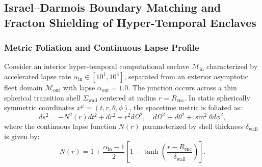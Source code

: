 \documentclass[11pt,onecolumn]{article}
\begin{document}
\subsection{Israel--Darmois Boundary Matching and Fracton Shielding of Hyper-Temporal Enclaves}
\label{sec:israel_darmois_enclaves}

\subsubsection{Metric Foliation and Continuous Lapse Profile}
Consider an interior hyper-temporal computational enclave $\mathcal{M}_{\text{in}}$ characterized by accelerated lapse rate $\alpha_{\text{in}} \in [10^1, 10^4]$, separated from an exterior asymptotic fleet domain $\mathcal{M}_{\text{out}}$ with lapse $\alpha_{\text{out}} = 1.0$. The junction occurs across a thin spherical transition shell $\Sigma_{\text{wall}}$ centered at radius $r = R_{\text{enc}}$. In static spherically symmetric coordinates $x^\mu = (t, r, \theta, \phi)$, the spacetime metric is foliated as:
\begin{equation}
    ds^2 = -N^2(r) dt^2 + dr^2 + r^2 d\Omega^2, \quad d\Omega^2 \equiv d\theta^2 + \sin^2\theta d\phi^2,
    \label{eq:enclave_metric}
\end{equation}
where the continuous lapse function $N(r)$ parameterized by shell thickness $\delta_{\text{wall}}$ is given by:
\begin{equation}
    N(r) = 1 + \frac{\alpha_{\text{in}} - 1}{2}\left[ 1 - \tanh\left( \frac{r - R_{\text{enc}}}{\delta_{\text{wall}}} \right) \right].
    \label{eq:lapse_profile}
\end{equation}
\end{document}
